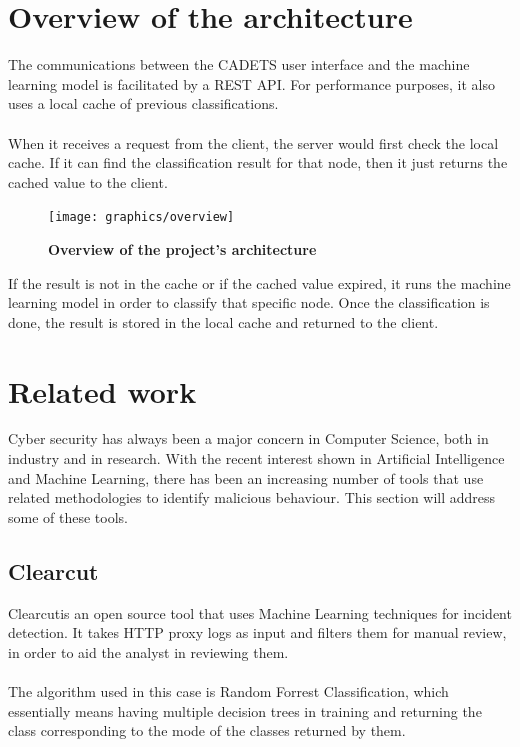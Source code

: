 \documentclass[12pt,a4paper,twoside,openright]{report}
\begin{document}
\section{Overview of the architecture}
The communications between the CADETS user interface and the machine learning model is facilitated by a REST API. For performance purposes, it also uses a local cache of previous classifications. 
\\ \\ 
When it receives a request from the client, the server would first check the local cache. If it can find the classification result for that node, then it just returns the cached value to the client.
\begin{figure}[H]
	\caption{\bf Overview of the project's architecture}
	\centering
	\texttt{[image: graphics/overview]}
\end{figure}
If the result is not in the cache or if the cached value expired, it runs the machine learning model in order to classify that specific node. Once the classification is done, the result is stored in the local cache and returned to the client. 

\section{Related work}
Cyber security has always been a major concern in Computer Science, both in industry and in research. With the recent interest shown in Artificial Intelligence and Machine Learning, there has been an increasing number of tools that use related methodologies to identify malicious behaviour. This section will address some of these tools. 

\subsection{Clearcut}
Clearcut\footnotemark[1] is an open source tool that uses Machine Learning techniques for incident detection. It takes HTTP proxy logs as input and filters them for manual review, in order to aid the analyst in reviewing them. 
\\ \\ 
The algorithm used in this case is Random Forrest Classification, which essentially means having multiple decision trees in training and returning the class corresponding to the mode of the classes returned by them. 

\end{document}
